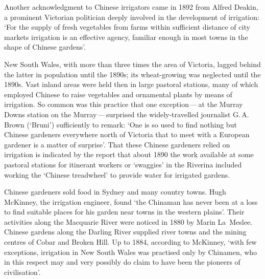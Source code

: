 Another acknowledgment to Chinese irrigators came in 1892 from Alfred
Deakin,  a prominent Victorian politician deeply
involved in the development of irrigation: `For the supply of fresh
vegetables from farms within sufficient distance of city markets
irrigation is an effective agency, familiar enough in most towns in
the shape of Chinese gardens'.

New South Wales,  with more than three times
the area of Victoria, lagged behind the latter in population until the
1890s; its wheat-growing was neglected until the 1890s.  Vast inland
areas were held then in large pastoral stations, many of which
employed Chinese  to raise vegetables and ornamental
plants by means of irrigation.  So common was this practice that one
exception\,---\,at the Murray Downs station  on the Murray\,---\,surprised
 the
widely-travelled journalist G.\,A. Brown (`Bruni')  sufficiently to remark: `One is so used to find nothing but
Chinese gardeners everywhere north of Victoria that to meet with a
European gardener is a matter of surprise'.  That these Chinese
gardeners relied on irrigation is indicated by the report that about
1890 the work available at some pastoral stations for itinerant
workers or `swaggies' in the Riverina  included
working the `Chinese treadwheel' to provide water for irrigated
gardens.

Chinese gardeners sold food in Sydney  and many country
towns. Hugh McKinney,  the irrigation engineer,
found `the Chinaman has never been at a loss to find suitable places
for his garden near towns in the western plains'.  Their activities
along the Macquarie River  were noticed in 1880
by Marin La~Meslee.   Chinese gardens along the
Darling River  supplied river towns and the
mining centres of Cobar  and Broken Hill.  Up to 1884, according to McKinney, `with few exceptions,
irrigation in New South Wales was practised only by Chinamen, who in
this respect may and very possibly do claim to have been the pioneers
of civilisation'.

